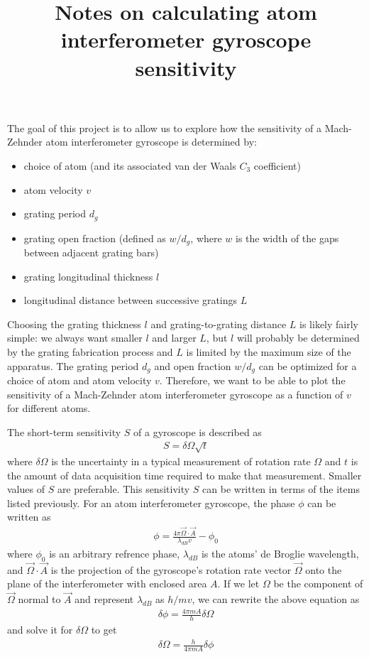 \documentclass[twocolumn,pra,showpacs,superscriptaddress,longbibliography]{revtex4-1}   %
\begin{document}
\title{Notes on calculating atom interferometer gyroscope sensitivity}
\maketitle


The goal of this project is to allow us to explore how the sensitivity of a Mach-Zehnder atom interferometer gyroscope is determined by:
\begin{itemize}
	\item choice of atom (and its associated van der Waals $C_3$ coefficient)
	\item atom velocity $v$
	\item grating period $d_g$
	\item grating open fraction (defined as $w/d_g$, where $w$ is the width of the gaps between adjacent grating bars)
	\item grating longitudinal thickness $l$
	\item longitudinal distance between successive gratings $L$
\end{itemize}
Choosing the grating thickness $l$ and grating-to-grating distance $L$ is likely fairly simple: we always want smaller $l$ and larger $L$, but $l$ will probably be determined by the grating fabrication process and $L$ is limited by the maximum size of the apparatus. The grating period $d_g$ and open fraction $w/d_g$ can be optimized for a choice of atom and atom velocity $v$. Therefore, we want to be able to plot the sensitivity of a Mach-Zehnder atom interferometer gyroscope as a function of $v$ for different atoms.


The short-term sensitivity $S$ of a gyroscope is described as 
\begin{align}
	S = \delta\Omega \sqrt{t}
	\label{sensitivityGeneral}
\end{align}
where $\delta\Omega$ is the uncertainty in a typical measurement of rotation rate $\Omega$ and $t$ is the amount of data acquisition time required to make that measurement. Smaller values of $S$ are preferable.
This sensitivity $S$ can be written in terms of the items listed previously.
For an atom interferometer gyroscope, the phase $\phi$ can be written as
\begin{align}
	\phi = \frac{4\pi\vec{\Omega}\cdot\vec{A}}{\lambda_{dB} v} - \phi_0
\end{align}
where $\phi_0$ is an arbitrary refrence phase, $\lambda_{dB}$ is the atoms' de Broglie wavelength, and $\vec{\Omega}\cdot\vec{A}$ is the projection of the gyroscope's rotation rate vector $\vec{\Omega}$ onto the plane of the interferometer with enclosed area $A$. If we let $\Omega$ be the component of $\vec{\Omega}$ normal to $\vec{A}$ and represent $\lambda_{dB}$ as $h/mv$, we can rewrite the above equation as
\begin{align}
	\delta\phi = \frac{4\pi m A}{h}\delta\Omega
\end{align}
and solve it for $\delta\Omega$ to get
\begin{align}
	\delta\Omega = \frac{h}{4\pi m A}\delta\phi
	\label{deltaOmega}
\end{align}
\end{document}
